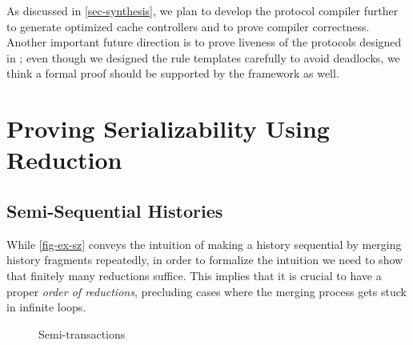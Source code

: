 \documentclass[sigplan,10pt,review,anonymous,screen]{acmart}\settopmatter{printfolios=true,printccs=false,printacmref=false}
\begin{document}
As discussed in \autoref{sec-synthesis}, we plan to develop the protocol compiler further to generate optimized cache controllers and to prove compiler correctness.
Another important future direction is to prove liveness of the protocols designed in \hemiola{}; even though we designed the rule templates carefully to avoid deadlocks, we think a formal proof should be supported by the framework as well.





\clearpage
\appendix

\section{Proving Serializability Using Reduction}
\label{sec-appx-proof-sz}

\subsection{Semi-Sequential Histories}
\label{sec-appx-semi-sequential}

While \autoref{fig-ex-sz} conveys the intuition of making a history sequential by merging history fragments repeatedly, in order to formalize the intuition we need to show that finitely many reductions suffice.
This implies that it is crucial to have a proper \emph{order of reductions}, precluding cases where the merging process gets stuck in infinite loops.

\begin{figure}[h]
  \centering
  \caption{Semi-transactions}
  \label{fig-semi-trs}
\end{figure}
\end{document}
